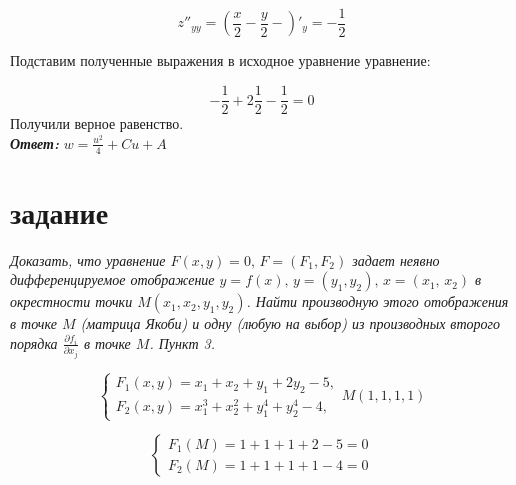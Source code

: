 \documentclass[a5paper, 10pt]{article}
\theoremstyle{definition}
\theoremstyle{plain}
\theoremstyle{remark}
\begin{document}
\begin{equation}
z''_{yy} = \left(  \frac{x}{2} - \frac{y}{2} - \right)'_y =  - \frac{ 1}{2}
\end{equation}

Подставим полученные выражения в исходное уравнение уравнение:

\begin{equation}
- \frac{ 1}{2} + 2\frac{ 1}{2} - \frac{ 1}{2} = 0
\end{equation}
Получили верное равенство.\\

\textit{\textbf{Ответ:}} $ w =  \frac{u^2}{4} + Cu + A $


\newpage

\section{задание}
\textit{Доказать, что уравнение $F(x,y)=0, \, F=(F_1, F_2)$ задает неявно дифференцируемое отображение $y=f(x), \, y=(y_1, y_2), \, x = (x_1, \, x_2)$ в окрестности точки $M(x_1, x_2, y_1, y_2)$. Найти производную этого отображения в точке $M$ (матрица Якоби) и одну (любую на выбор) из производных второго порядка $\frac{\partial f_i}{\partial x_j}$ в точке $M$. Пункт 3.}

\begin{equation}
\begin{cases}
F_1 (x, y) = x_1 + x_2 + y_1 + 2y_2 -5,\\
F_2 (x, y) = x^3_1 + x^2_2 +y^4_1+y^4_2-4,
\end{cases}
M(1, 1, 1, 1)
\end{equation}



\begin{equation}
\begin{cases}
F_1(M) = 1 + 1 + 1 + 2 - 5 = 0\\
F_2(M) = 1 + 1 + 1 + 1 -4 = 0
\end{cases}
\end{equation}
\end{document}
